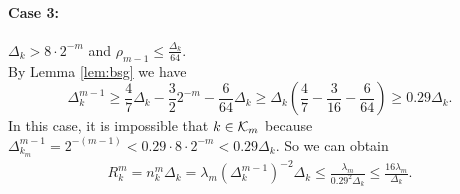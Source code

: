 \paragraph{Case 3:} $\Delta_k > 8 \cdot 2^{-m}$ and $\rho_{m-1} \leq \frac{\Delta_k}{64}$.\\
By Lemma \ref{lem:bsg} we have
\[\Delta_k^{m-1} \geq \frac{4}{7}\Delta_k - \frac{3}{2}2^{-m} - \frac{6}{64}\Delta_k \geq \Delta_k\left(\frac{4}{7} - \frac{3}{16} - \frac{6}{64}\right) \geq 0.29 \Delta_k.\]
In this case, it is impossible that $k \in {\mathcal{K}}_m$ because $\Delta_{k_m}^{m-1} = 2^{-(m-1)}<0.29\cdot 8\cdot 2^{-m}<0.29\Delta_k$.
So we can obtain
\begin{align*}
   R_k^m= n_k^m \Delta_k = \lambda_m(\Delta_k^{m-1})^{-2} \Delta_k
    \leq \frac{\lambda_m}{0.29^2 \Delta_k} 
    \leq \frac{16\lambda_m}{\Delta_k}.
\end{align*}

